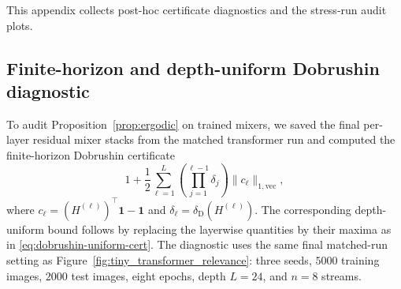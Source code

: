 \documentclass[10pt]{article}
\numberwithin{equation}{section}
\theoremstyle{plain}
\theoremstyle{definition}
\theoremstyle{remark}
\newcommand{\ones}{\mathbf{1}}
\begin{document}
This appendix collects post-hoc certificate diagnostics and the stress-run audit plots.

\subsection{Finite-horizon and depth-uniform Dobrushin diagnostic}
\label{app:dobrushin-diagnostic}

To audit Proposition~\ref{prop:ergodic} on trained mixers, we saved the final
per-layer residual mixer stacks from the matched transformer run and computed the
finite-horizon Dobrushin certificate
\[
1+\frac12\sum_{\ell=1}^L
\left(\prod_{j=1}^{\ell-1}\delta_j\right)
\|c_\ell\|_{1,\mathrm{vec}},
\]
where
\(c_\ell=(H^{(\ell)})^\top\ones-\ones\) and
\(\delta_\ell=\delta_{\mathrm D}(H^{(\ell)})\). The corresponding
depth-uniform bound follows by replacing the layerwise quantities by their
maxima as in \eqref{eq:dobrushin-uniform-cert}.
The diagnostic uses the same final matched-run setting as
Figure~\ref{fig:tiny_transformer_relevance}: three seeds, \(5000\) training
images, \(2000\) test images, eight epochs, depth \(L=24\), and \(n=8\) streams.

\end{document}

